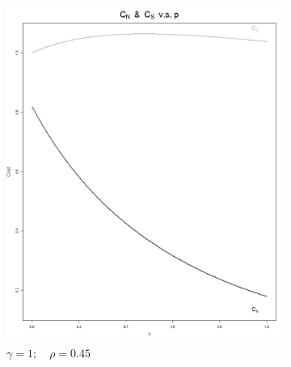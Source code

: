 \documentclass[11pt]{article}
\numberwithin{equation}{section}
\begin{document}
\newpage
\begin{figure}[h!]
	\centering
	\begin{subfigure}[b]{0.49\textwidth}
	\includegraphics[width=\textwidth]{plots/cost_vs_p_1_0_45.png}
	\caption{$\gamma=1;\quad\rho=0.45$}
	\label{cost_vs_p_1_0_45}
	\end{subfigure}
	\begin{subfigure}[b]{0.49\textwidth}

\end{subfigure}
\end{figure}
\end{document}
